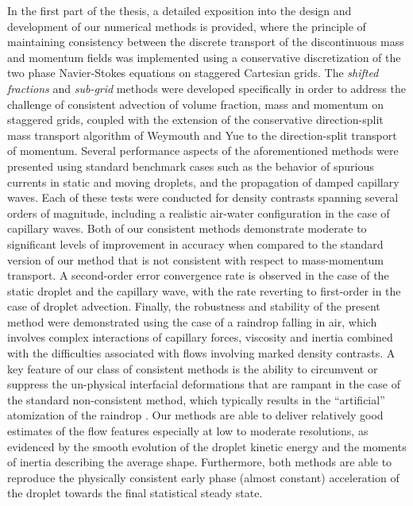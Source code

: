 In the first part of the thesis, a detailed exposition into the design and 
development of our numerical methods is provided, where the principle 
of maintaining consistency between the discrete transport of
the discontinuous mass and momentum fields was implemented  
using a conservative discretization of the two phase 
Navier-Stokes equations on staggered Cartesian grids. 
The \textit{shifted fractions} and \textit{sub-grid} methods were developed
specifically in order to address the challenge of consistent 
advection of volume fraction, mass and momentum on staggered grids,
coupled with the extension of the conservative direction-split mass transport
algorithm of Weymouth and Yue \cite{wy} to the direction-split transport of momentum.
Several performance aspects of the aforementioned methods were presented using 
standard benchmark cases such as the behavior of spurious currents in static and
moving droplets, and the propagation of damped capillary waves. 
Each of these tests were conducted for density contrasts spanning several orders of magnitude, 
including a realistic air-water configuration in the case of capillary waves. 
Both of our consistent methods demonstrate moderate to significant levels of improvement 
in accuracy when compared to the standard version of our method that is not 
consistent with respect to mass-momentum transport. 
A second-order error convergence rate is observed in the case of the 
static droplet and the capillary wave, with the rate
reverting to first-order in the case of droplet advection.
Finally, the robustness and stability of the present method were demonstrated
using the case of a raindrop falling in air, which involves complex interactions
of capillary forces, viscosity and inertia combined with the difficulties associated
with flows involving marked density contrasts.  
A key feature of our class of consistent methods is the ability to circumvent 
or suppress the un-physical interfacial deformations that are rampant 
in the case of the standard non-consistent method, which typically results in the 
``artificial'' atomization of the raindrop .
Our methods are able to deliver relatively good estimates of the flow features 
especially at low to moderate resolutions, as evidenced by the smooth evolution 
of the droplet kinetic energy and the moments of inertia describing the average shape. 
Furthermore, both methods are able to reproduce the physically consistent early phase 
(almost constant) acceleration of the droplet towards the final statistical steady state.  

